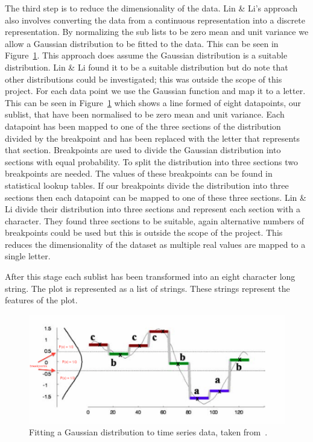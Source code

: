 The third step is to reduce the dimensionality of the data.  Lin \& Li's approach also involves converting the data from a continuous representation into a discrete representation.  By normalizing the sub lists to be zero mean and unit variance we allow a Gaussian distribution to be fitted to the data.  This can be seen in Figure~\ref{fig:gaussian_plot}.  This approach does assume the Gaussian distribution is a suitable distribution.  Lin \& Li found it to be a suitable distribution but do note that other distributions could be investigated; this was outside the scope of this project.  For each data point we use the Gaussian function and map it to a letter.  This can be seen in Figure~\ref{fig:gaussian_plot} which shows a line formed of eight datapoints, our sublist, that have been normalised to be zero mean and unit variance.  Each datapoint has been mapped to one of the three sections of the distribution divided by the breakpoint and has been replaced with the letter that represents that section.  Breakpoints are used to divide the Gaussian distribution into sections with equal probability.  To split the distribution into three sections two breakpoints are needed. The values of these breakpoints can be found in statistical lookup tables.  If our breakpoints divide the distribution into three sections then each datapoint can be mapped to one of these three sections.  Lin \& Li divide their distribution into three sections and represent each section with a character.  They found three sections to be suitable, again alternative numbers of breakpoints could be used but this is outside the scope of the project.  This reduces the dimensionality of the dataset as multiple real values are mapped to a single letter.

After this stage each sublist has been transformed into an eight character long string.  The plot is represented as a list of strings.  These strings represent the features of the plot.

\begin{figure}[h!]
    \centering
    \includegraphics[width=\textwidth]{images/similiarty_normalise.png}
    \caption{Fitting a Gaussian distribution to time series data, taken from~\cite{structural_similarity}.}
    \label{fig:gaussian_plot}
\end{figure}

